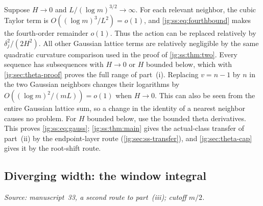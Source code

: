 \documentclass[11pt,a4paper]{article}
\theoremstyle{definition}\newaliascnt{definition}{theorem}
\theoremstyle{remark}\newaliascnt{remark}{theorem}
\begin{document}
Suppose $H\to0$ and $L/(\log m)^{3/2}\to\infty$. For each relevant neighbor, the
cubic Taylor term is $O((\log m)^3/L^2)=o(1)$, and \eqref{jg:ss:eq:fourthbound}
makes the fourth-order remainder $o(1)$. Thus the action can be replaced
relatively by $\delta_j^2/(2H^2)$. All other Gaussian lattice terms are
relatively negligible by the same quadratic curvature comparison used in the
proof of \cref{jg:ss:thm:two}. Every sequence has subsequences with $H\to0$ or
$H$ bounded below, which with \cref{jg:sec:theta-proof} proves the full range
of part~(i). Replacing $v=n-1$ by $n$ in the two Gaussian neighbors changes
their logarithms by $O((\log m)^2/(mL))=o(1)$ when $H\to0$. This can also be
seen from the entire Gaussian lattice sum, so a change in the identity of a
nearest neighbor causes no problem. For $H$ bounded below, use the bounded
theta derivatives. This proves \eqref{jg:ss:eq:gauss};
\cref{jg:ss:thm:main} gives the actual-class transfer of part~(ii) by the
endpoint-layer route (\cref{jg:sec:ss-transfer}), and
\cref{jg:sec:theta-cap} gives it by the root-shift route.

\subsection{Diverging width: the window integral}
\label{jg:sec:window}
\emph{Source: manuscript~33, a second route to part~(iii); cutoff $m/2$.}
\end{document}
